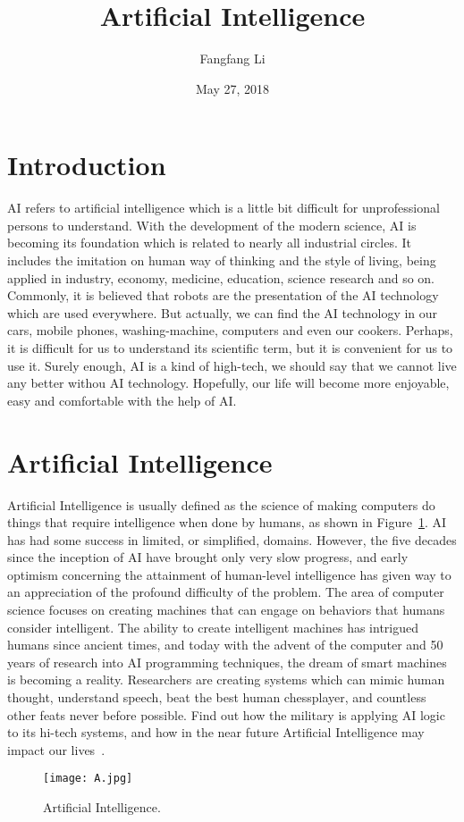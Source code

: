 \documentclass{article}
\title{Artificial Intelligence}
\author{Fangfang Li}
\date{May 27, 2018}
\begin{document}
\twocolumn
\maketitle
\section{Introduction}

 AI refers to artificial intelligence which is a little bit difficult for unprofessional persons to understand. With the development of the modern science, AI is becoming its foundation which is related to nearly all industrial circles. It includes the imitation on human way of thinking and the style of living, being applied in industry, economy, medicine, education, science research and so on. Commonly, it is believed that robots are the presentation of the AI technology which are used everywhere. But actually, we can find the AI technology in our cars, mobile phones, washing-machine, computers and even our cookers. Perhaps, it is difficult for us to understand its scientific term, but it is convenient for us to use it. Surely enough, AI is a kind of high-tech, we should say that we cannot live any better withou AI technology. Hopefully, our life will become more enjoyable, easy and comfortable with the help of AI.

\section{Artificial Intelligence}
Artificial Intelligence is usually defined as the science of making computers do things that require intelligence when done by humans, as shown in Figure~\ref{1}. AI has had some success in limited, or simplified, domains. However, the five decades since the inception of AI have brought only very slow progress, and early optimism concerning the attainment of human-level intelligence has given way to an appreciation of the profound difficulty of the problem.
The area of computer science focuses on creating machines that can engage on behaviors that humans consider intelligent. The ability to create intelligent machines has intrigued humans since ancient times, and today with the advent of the computer and 50 years of research into AI programming techniques, the dream of smart machines is becoming a reality. Researchers are creating systems which can mimic human thought, understand speech, beat the best human chessplayer, and countless other feats never before possible. Find out how the military is applying AI logic to its hi-tech systems, and how in the near future Artificial Intelligence may impact our lives~\cite{Lawrence1997Face}.

\begin{figure}[!htb]
\centering
\texttt{[image: A.jpg]}
\caption{Artificial Intelligence. }
\label{1}
\end{figure}



\end{document}
